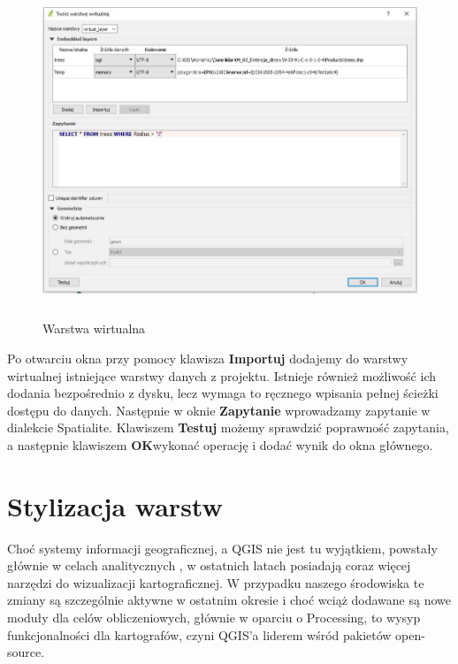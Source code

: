 \documentclass[12pt,a4paper]{book}
\begin{document}
\begin{center}
\begin{figure}
\includegraphics[width=13cm,height=9.917cm]{006-virtual.jpg}
\caption{Warstwa wirtualna}
\end{figure}
\end{center}
Po otwarciu okna przy pomocy klawisza \textbf{Importuj }dodajemy do warstwy wirtualnej istniejące warstwy danych z projektu. Istnieje również możliwość ich dodania bezpośrednio z dysku, lecz wymaga to ręcznego wpisania pełnej ścieżki dostępu do danych. Następnie w oknie \textbf{Zapytanie }wprowadzamy zapytanie w dialekcie Spatialite. Klawiszem\textbf{ Testuj }możemy sprawdzić poprawność zapytania, a następnie klawiszem \textbf{OK}wykonać operację i dodać wynik do okna głównego.

\chapter{Stylizacja warstw}
Choć systemy informacji geograficznej, a QGIS nie jest tu wyjątkiem, powstały głównie w celach analitycznych \cite{kraak2011cartography}, w ostatnich latach posiadają coraz więcej narzędzi do wizualizacji kartograficznej. W przypadku naszego środowiska te zmiany są szczególnie aktywne w ostatnim okresie i choć wciąż dodawane są nowe moduły dla celów obliczeniowych, głównie w oparciu o Processing, to wysyp funkcjonalności dla kartografów, czyni QGIS'a liderem wśród pakietów open-source.
\end{document}
